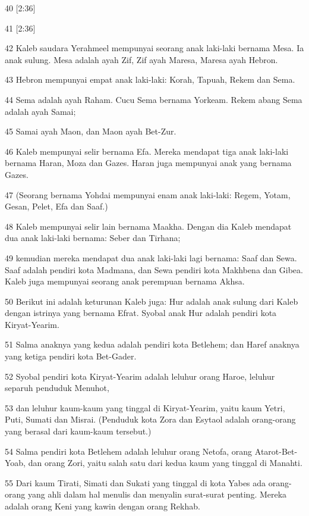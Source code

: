 \par 40 [2:36]
\par 41 [2:36]
\par 42 Kaleb saudara Yerahmeel mempunyai seorang anak laki-laki bernama Mesa. Ia anak sulung. Mesa adalah ayah Zif, Zif ayah Maresa, Maresa ayah Hebron.
\par 43 Hebron mempunyai empat anak laki-laki: Korah, Tapuah, Rekem dan Sema.
\par 44 Sema adalah ayah Raham. Cucu Sema bernama Yorkeam. Rekem abang Sema adalah ayah Samai;
\par 45 Samai ayah Maon, dan Maon ayah Bet-Zur.
\par 46 Kaleb mempunyai selir bernama Efa. Mereka mendapat tiga anak laki-laki bernama Haran, Moza dan Gazes. Haran juga mempunyai anak yang bernama Gazes.
\par 47 (Seorang bernama Yohdai mempunyai enam anak laki-laki: Regem, Yotam, Gesan, Pelet, Efa dan Saaf.)
\par 48 Kaleb mempunyai selir lain bernama Maakha. Dengan dia Kaleb mendapat dua anak laki-laki bernama: Seber dan Tirhana;
\par 49 kemudian mereka mendapat dua anak laki-laki lagi bernama: Saaf dan Sewa. Saaf adalah pendiri kota Madmana, dan Sewa pendiri kota Makhbena dan Gibea. Kaleb juga mempunyai seorang anak perempuan bernama Akhsa.
\par 50 Berikut ini adalah keturunan Kaleb juga: Hur adalah anak sulung dari Kaleb dengan istrinya yang bernama Efrat. Syobal anak Hur adalah pendiri kota Kiryat-Yearim.
\par 51 Salma anaknya yang kedua adalah pendiri kota Betlehem; dan Haref anaknya yang ketiga pendiri kota Bet-Gader.
\par 52 Syobal pendiri kota Kiryat-Yearim adalah leluhur orang Haroe, leluhur separuh penduduk Menuhot,
\par 53 dan leluhur kaum-kaum yang tinggal di Kiryat-Yearim, yaitu kaum Yetri, Puti, Sumati dan Misrai. (Penduduk kota Zora dan Esytaol adalah orang-orang yang berasal dari kaum-kaum tersebut.)
\par 54 Salma pendiri kota Betlehem adalah leluhur orang Netofa, orang Atarot-Bet-Yoab, dan orang Zori, yaitu salah satu dari kedua kaum yang tinggal di Manahti.
\par 55 Dari kaum Tirati, Simati dan Sukati yang tinggal di kota Yabes ada orang-orang yang ahli dalam hal menulis dan menyalin surat-surat penting. Mereka adalah orang Keni yang kawin dengan orang Rekhab.

